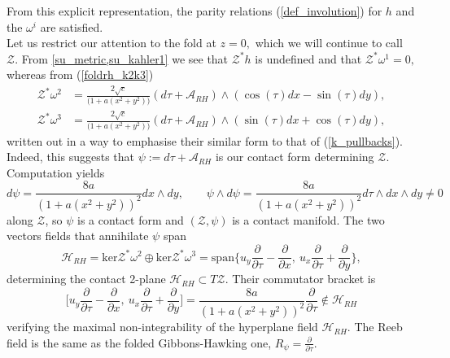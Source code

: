 \documentclass[a4paper,12pt, onecolumn, notitlepage]{article}
\theoremstyle{definition}
\theoremstyle{remark}
\newcommand{\w}{\omega}
\newcommand{\dd}[2]{\frac{\partial #1}{\partial #2}}
\begin{document}
From this explicit representation, the parity relations (\ref{def_involution}) for $h$ and the $\w^{i}$ are satisfied.\\
Let us restrict our attention to the fold at $z=0,$ which we will continue to call $\mathcal{Z}.$ From \cref{su_metric,su_kahler1} we see that $\mathcal{Z}^{\ast}h$ is undefined and that $\mathcal{Z}^{\ast}\w^{1}=0,$ whereas from (\ref{foldrh_k2k3})
\begin{align*}
	\mathcal{Z}^{\ast}\w^{2}&=\frac{2\sqrt{c}}{\big(1+a(x^{2}+y^{2})\big)}(d\tau + \mathcal{A}_{RH})\wedge(\cos(\tau)dx - \sin(\tau)dy),\\
	\mathcal{Z}^{\ast}\w^{3}&=\frac{2\sqrt{c}}{\big(1+a(x^{2}+y^{2})\big)}(d\tau + \mathcal{A}_{RH})\wedge(\sin(\tau)dx + \cos(\tau)dy),
\end{align*}
written out in a way to emphasise their similar form to that of (\ref{k_pullbacks}). Indeed, this suggests that $\psi:= d\tau+\mathcal{A}_{RH}$ is our contact form determining $\mathcal{Z}.$ Computation yields
\begin{equation*}
	d\psi = \frac{8a}{(1+a(x^{2} + y^{2}))^{2}}dx\wedge dy,\qquad \psi\wedge d\psi = \frac{8a}{(1+a(x^{2} + y^{2}))^{2}}d\tau\wedge dx\wedge dy\neq 0
\end{equation*}
along $\mathcal{Z}$, so $\psi$ is a contact form and $(\mathcal{Z},\psi)$ is a contact manifold. The two vectors fields that annihilate $\psi$ span
\begin{equation*}
	\mathcal{H}_{RH}=\text{ker}\mathcal{Z}^{\ast}\w^{2}\oplus\text{ker}\mathcal{Z}^{\ast}\w^{3} = \text{span}\bigg\{  u_{y}\dd{}{\tau} - \dd{}{x},\ u_{x}\dd{}{\tau} + \dd{}{y}\bigg\},
\end{equation*}
determining the contact 2-plane $\mathcal{H}_{RH}\subset T\mathcal{Z}.$ Their commutator bracket is
\begin{equation*}
	\bigg[u_{y}\dd{}{\tau} - \dd{}{x},\ u_{x}\dd{}{\tau} + \dd{}{y}\bigg] = \frac{8a}{(1+a(x^{2} + y^{2}))^{2}}\dd{}{\tau}\not\in\mathcal{H}_{RH}
\end{equation*}
verifying the maximal non-integrability of the hyperplane field $\mathcal{H}_{RH}.$ The Reeb field is the same as the folded Gibbons-Hawking one, $R_{\psi} = \dd{}{\tau}.$\\
\end{document}
